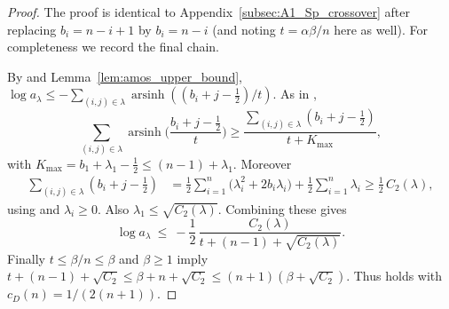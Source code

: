 \begin{proof}
The proof is identical to Appendix~\ref{subsec:A1_Sp_crossover} after replacing $b_i=n-i+1$ by $b_i=n-i$
(and noting $t=\alpha\beta/n$ here as well).
For completeness we record the final chain.

By  and Lemma~\ref{lem:amos_upper_bound},
\(\log a_{\lambda}\le -\sum_{(i,j)\in\lambda} \operatorname{arsinh}((b_i+j-\tfrac12)/t)\).
As in ,
\begin{equation}
\label{eq:SOeven_asinh_lower}
\sum_{(i,j)\in\lambda} \operatorname{arsinh}\Big(\frac{b_i+j-\tfrac12}{t}\Big)
\ge \frac{\sum_{(i,j)\in\lambda}(b_i+j-\tfrac12)}{t+K_{\max}},
\end{equation}
with $K_{\max}=b_1+\lambda_1-\tfrac12\le (n-1)+\lambda_1$.
Moreover
\begin{align*}
\sum_{(i,j)\in\lambda}(b_i+j-\tfrac12)
&=\frac12\sum_{i=1}^n\big(\lambda_i^2+2b_i\lambda_i\big)+\frac12\sum_{i=1}^n\lambda_i
\ge \frac12\,C_2(\lambda),
\end{align*}
using  and $\lambda_i\ge 0$.
Also $\lambda_1\le \sqrt{C_2(\lambda)}$.
Combining these gives
\begin{equation}
\label{eq:SOeven_log_final}
\log a_{\lambda}\ \le\ -\frac12\,\frac{C_2(\lambda)}{t+(n-1)+\sqrt{C_2(\lambda)}}.
\end{equation}
Finally $t\le \beta/n\le \beta$ and $\beta\ge 1$ imply
$t+(n-1)+\sqrt{C_2}\le \beta+n+\sqrt{C_2}\le (n+1)(\beta+\sqrt{C_2})$.
Thus  holds with $c_{D}(n)=1/(2(n+1))$.
\end{proof}

